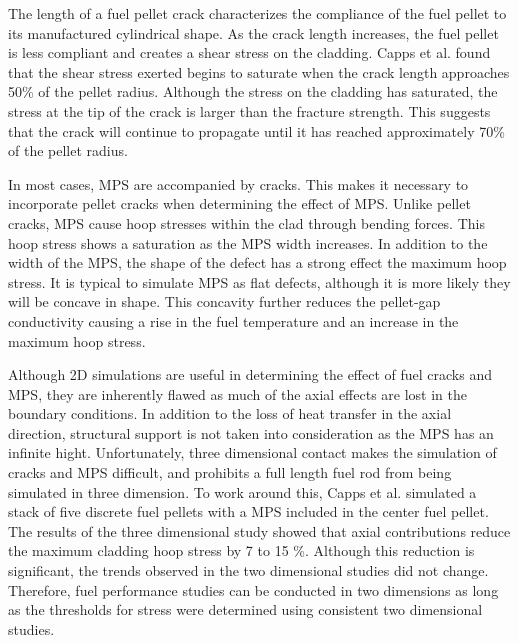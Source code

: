 \documentclass[edeposit,fullpage,11pt]{uiucthesis2009}
\begin{document}
The length of a fuel pellet crack characterizes the compliance of the fuel pellet to its manufactured cylindrical shape.
As the crack length increases, the fuel pellet is less compliant and creates a shear stress on the cladding.
Capps et al. found that the shear stress exerted begins to saturate when the crack length approaches 50\% of the pellet radius.
Although the stress on the cladding has saturated, the stress at the tip of the crack is larger than the fracture strength.
This suggests that the crack will continue to propagate until it has reached approximately 70\% of the pellet radius.

In most cases, \gls{MPS} are accompanied by cracks.
This makes it necessary to incorporate pellet cracks when determining the effect of \gls{MPS}.
Unlike pellet cracks, \gls{MPS} cause hoop stresses within the clad through bending forces.
This hoop stress shows a saturation as the \gls{MPS} width increases.
In addition to the width of the \gls{MPS}, the shape of the defect has a strong effect the maximum hoop stress.
It is typical to simulate \gls{MPS} as flat defects, although it is more likely they will be concave in shape. 
This concavity further reduces the pellet-gap conductivity causing a rise in the fuel temperature and an increase in the maximum hoop stress.

Although 2D simulations are useful in determining the effect of fuel cracks and \gls{MPS}, they are inherently flawed as much of the axial effects are lost in the boundary conditions.
In addition to the loss of heat transfer in the axial direction, structural support is not taken into consideration as the \gls{MPS} has an infinite hight.
Unfortunately, three dimensional contact makes the simulation of cracks and \gls{MPS} difficult, and prohibits a full length fuel rod from being simulated in three dimension. 
To work around this, Capps et al. simulated a stack of five discrete fuel pellets with a \gls{MPS} included in the center fuel pellet.
The results of the three dimensional study showed that axial contributions reduce the maximum cladding hoop stress by 7 to 15 \%.
Although this reduction is significant, the trends observed in the two dimensional studies did not change.
Therefore, fuel performance studies can be conducted in two dimensions as long as the thresholds for stress were determined using consistent two dimensional studies.
\end{document}
